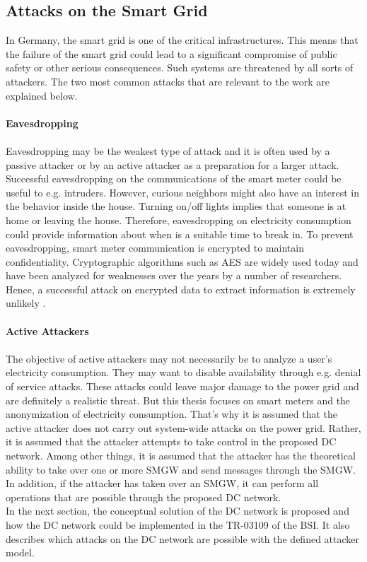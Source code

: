 \subsection{Attacks on the Smart Grid}
\label{subsec:attacks}
In Germany, the smart grid is one of the critical infrastructures. This means that the failure of the smart grid could lead to a significant compromise of public safety or other serious consequences. Such systems are threatened by all sorts of attackers. The two most common attacks that are relevant to the work are explained below.
\\
\\
\textbf{Eavesdropping}
\\
\\
Eavesdropping may be the weakest type of attack and it is often used by a passive attacker or by an active attacker as a preparation for a larger attack. Successful eavesdropping on the communications of the smart meter could be useful to e.g. intruders. However, curious neighbors might also have an interest in the behavior inside the house. Turning on/off lights implies that someone is at home or leaving the house. Therefore, eavesdropping on electricity consumption could provide information about when is a suitable time to break in. To prevent eavesdropping, smart meter communication is encrypted to maintain confidentiality. Cryptographic algorithms such as AES are widely used today and have been analyzed for weaknesses over the years by a number of researchers. Hence, a successful attack on encrypted data to extract information is extremely unlikely \cite{lemay2007unified}.
\\
\\
\textbf{Active Attackers}
\\
\\
The objective of active attackers may not necessarily be to analyze a user's electricity consumption. They may want to disable availability through e.g. denial of service attacks. These attacks could leave major damage to the power grid and are definitely a realistic threat. But this thesis focuses on smart meters and the anonymization of electricity consumption. That's why it is assumed that the active attacker does not carry out system-wide attacks on the power grid. Rather, it is assumed that the attacker attempts to take control in the proposed DC network. Among other things, it is assumed that the attacker has the theoretical ability to take over one or more \gls{SMGW} and send messages through the \gls{SMGW}. In addition, if the attacker has taken over an \gls{SMGW}, it can perform all operations that are possible through the proposed DC network.\\In the next section, the conceptual solution of the DC network is proposed and how the DC network could be implemented in the \gls{TR-03109} of the \gls{BSI}. It also describes which attacks on the DC network are possible with the defined attacker model.

\clearpage

